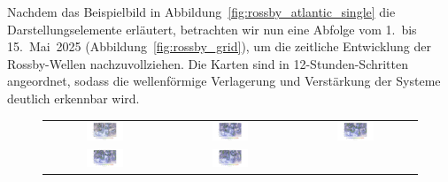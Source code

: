 Nachdem das Beispielbild in Abbildung~\ref{fig:rossby_atlantic_single} die 
Darstellungselemente erläutert, betrachten wir nun eine Abfolge vom 1.\ bis 15.\ Mai~2025 
(Abbildung~\ref{fig:rossby_grid}), um die zeitliche Entwicklung der Rossby-Wellen 
nachzuvollziehen. Die Karten sind in 12-Stunden-Schritten angeordnet, sodass die 
wellenförmige Verlagerung und Verstärkung der Systeme deutlich erkennbar wird.


\begin{figure}
	\centering
	\renewcommand{\arraystretch}{0.5}
	\begin{tabular}{ccc}
		\includegraphics[width=0.32\textwidth, trim=5.75cm 3cm 5cm 0.9cm, clip]{papers/rossby/images/weather/data_2025_5_1_00-00_500.pdf} &
		\includegraphics[width=0.32\textwidth, trim=5.75cm 3cm 5cm 0.9cm, clip]{papers/rossby/images/weather/data_2025_5_1_12-00_500.pdf} &
		\includegraphics[width=0.32\textwidth, trim=5.75cm 3cm 5cm 0.9cm, clip]{papers/rossby/images/weather/data_2025_5_2_00-00_500.pdf}   \\
		\includegraphics[width=0.32\textwidth, trim=5.75cm 3cm 5cm 0.9cm, clip]{papers/rossby/images/weather/data_2025_5_2_12-00_500.pdf} &
		\includegraphics[width=0.32\textwidth, trim=5.75cm 3cm 5cm 0.9cm, clip]{papers/rossby/images/weather/data_2025_5_3_00-00_500.pdf} &

\end{tabular}
\end{figure}
